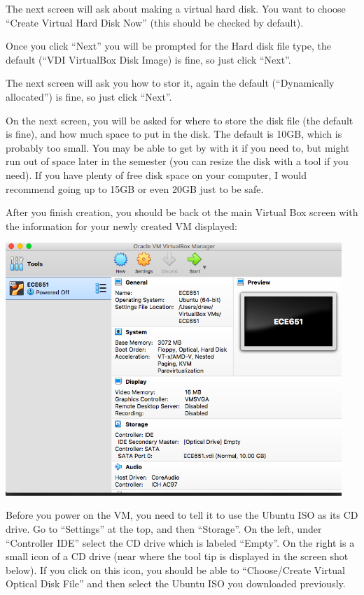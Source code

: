 \documentclass[12pt]{article}
\begin{document}
The next screen will  ask about making a virtual hard disk.  You want to choose
``Create Virtual Hard Disk Now'' (this should be checked by default).

Once you click ``Next'' you will be prompted for the Hard disk file type,
the default (``VDI VirtualBox Disk Image) is fine, so just click ``Next''.

The next screen will ask you how to stor it, again the default
(``Dynamically allocated'') is fine, so just click ``Next''.

On the next screen, you will be asked for where to store the disk file
(the default is fine), and how much space to put in the disk.  The
default is 10GB, which is probably too small.  You may be able to get
by with it if you need to, but might run out of space later in the
semester (you can resize the disk with a tool if you need).  If you
have plenty of free disk space on your computer, I would recommend
going up to 15GB or even 20GB just to be safe.

After you finish creation, you should be back ot the main Virtual Box
screen with the information for your newly created VM displayed:

\begin{center}
  \includegraphics[width=5.0in]{vbox3.png}
\end{center}

Before you power on the VM, you need to tell it to use the Ubuntu ISO
as its CD drive.  Go to ``Settings'' at the top, and then ``Storage''.
On the left, under ``Controller IDE'' select the CD drive which is
labeled ``Empty''.  On the right is a small icon of a CD drive (near
where the tool tip is displayed in the screen shot below).  If you
click on this icon, you should be able to ``Choose/Create Virtual Optical
Disk File'' and then select the Ubuntu ISO you downloaded previously.
\end{document}
